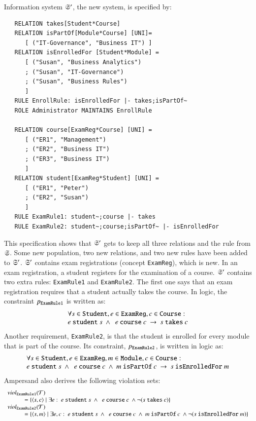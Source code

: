 \documentclass{elsarticle}
\begin{document}
   Information system $\mathfrak{S}'$, the new system, is specified by:
\begin{verbatim}
   RELATION takes[Student*Course]
   RELATION isPartOf[Module*Course] [UNI]=
      [ ("IT-Governance", "Business IT") ]
   RELATION isEnrolledFor [Student*Module] =
      [ ("Susan", "Business Analytics")
      ; ("Susan", "IT-Governance")
      ; ("Susan", "Business Rules")
      ]
   RULE EnrollRule: isEnrolledFor |- takes;isPartOf~
   ROLE Administrator MAINTAINS EnrollRule
   
   RELATION course[ExamReg*Course] [UNI] =
      [ ("ER1", "Management")
      ; ("ER2", "Business IT")
      ; ("ER3", "Business IT")
      ]
   RELATION student[ExamReg*Student] [UNI] =
      [ ("ER1", "Peter")
      ; ("ER2", "Susan")
      ]
   RULE ExamRule1: student~;course |- takes
   RULE ExamRule2: student~;course;isPartOf~ |- isEnrolledFor
\end{verbatim}
   This specification shows that $\mathfrak{S}'$ gets to keep all three relations and the rule from $\mathfrak{S}$.
   Some new population, two new relations, and two new rules have been added to $\mathfrak{S}'$.
   $\mathfrak{S}'$ contains exam registrations (concept \verb-ExamReg-), which is new.
   In an exam registration, a student registers for the examination of a course.
   $\mathfrak{S}'$ contains two extra rules: \verb-ExamRule1- and \verb-ExamRule2-.
   The first one says that an exam registration requires that a student actually takes the course.
   In logic, the constraint $p_{\tt ExamRule1}$ is written as:
\[\begin{array}{l}\forall s\in\text{\tt Student}, e\in\text{\tt ExamReg}, c\in\text{\tt Course}:\\
   e\ \text{\tt student}\ s\ \wedge\ \ e\ \text{\tt course}\ c\ \rightarrow\ s\ \text{\tt takes}\ c\\
\end{array}\]
   Another requirement, \verb-ExamRule2-, is that the student is enrolled for every module that is part of the course.
   Its constraint, $p_{\tt ExamRule2}$, is written in logic as:
\[\begin{array}{l}\forall s\in\text{\tt Student}, e\in\text{\tt ExamReg}, m\in\text{\tt Module}, c\in\text{\tt Course}:\\
   e\ \text{\tt student}\ s\ \wedge\ \ e\ \text{\tt course}\ c\ \wedge\ m\ \text{\tt isPartOf}\ c\ \rightarrow\ s\ \text{\tt isEnrolledFor}\ m
\end{array}\]
   Ampersand also derives the following violation sets:
\[\begin{array}{l}
   \viol{\text{\tt ExamRule1}}{\triples}\\
   \hspace{1cm}=\{\pair{s}{c}\mid\exists e:\ e\ \text{\tt student}\ s\ \wedge\ \ e\ \text{\tt course}\ c\ \wedge\neg(s\ \text{\tt takes}\ c)\}\\
   \viol{\text{\tt ExamRule2}}{\triples}\\
   \hspace{1cm}=\{\pair{s}{m}\mid\exists e,c:\ e\ \text{\tt student}\ s\ \wedge\ \ e\ \text{\tt course}\ c\ \wedge\ m\ \text{\tt isPartOf}\ c\ \wedge\neg(s\ \text{\tt isEnrolledFor}\ m)\}
\end{array}\]
\end{document}
